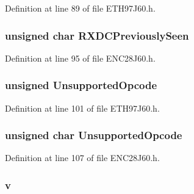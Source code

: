Definition at line 89 of file E\+T\+H97\+J60.\+h.

\hypertarget{union_r_x_s_t_a_t_u_s_a105bf29697fb000a90eeb15cfe0d2a45}{}
\subsubsection[{R\+X\+D\+C\+Previously\+Seen}]{\setlength{\rightskip}{0pt plus 5cm}unsigned char R\+X\+D\+C\+Previously\+Seen}\label{union_r_x_s_t_a_t_u_s_a105bf29697fb000a90eeb15cfe0d2a45}


Definition at line 95 of file E\+N\+C28\+J60.\+h.

\hypertarget{union_r_x_s_t_a_t_u_s_a65608601d4c82fb18e789c99c57d0059}{}
\subsubsection[{Unsupported\+Opcode}]{\setlength{\rightskip}{0pt plus 5cm}unsigned Unsupported\+Opcode}\label{union_r_x_s_t_a_t_u_s_a65608601d4c82fb18e789c99c57d0059}


Definition at line 101 of file E\+T\+H97\+J60.\+h.

\hypertarget{union_r_x_s_t_a_t_u_s_af9d33d055ed2af0f446bad750b363ec4}{}
\subsubsection[{Unsupported\+Opcode}]{\setlength{\rightskip}{0pt plus 5cm}unsigned char Unsupported\+Opcode}\label{union_r_x_s_t_a_t_u_s_af9d33d055ed2af0f446bad750b363ec4}


Definition at line 107 of file E\+N\+C28\+J60.\+h.

\hypertarget{union_r_x_s_t_a_t_u_s_a32c4cdd65ca9bf67a46f0a42448489d8}{}
\subsubsection[{v}]{ v}\label{union_r_x_s_t_a_t_u_s_a32c4cdd65ca9bf67a46f0a42448489d8}


